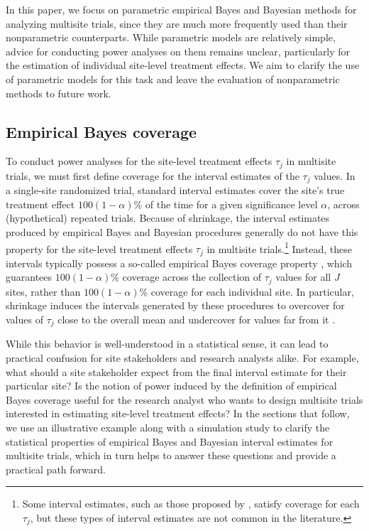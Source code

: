 \documentclass[]{article}
\begin{document}
In this paper, we focus on parametric empirical Bayes and Bayesian methods for analyzing multisite trials, since they are much more frequently used than their nonparametric counterparts.
While parametric models are relatively simple, advice for conducting power analyses on them remains unclear, particularly for the estimation of individual site-level treatment effects.
We aim to clarify the use of parametric models for this task and leave the evaluation of nonparametric methods to future work.

\subsection{Empirical Bayes coverage}

To conduct power analyses for the site-level treatment effects $\tau_j$ in multisite trials, we must first define coverage for the interval estimates of the $\tau_j$ values.
In a single-site randomized trial, standard interval estimates cover the site's true treatment effect $100(1-\alpha)$\% of the time for a given significance level $\alpha$, across (hypothetical) repeated trials.
Because of shrinkage, the interval estimates produced by empirical Bayes and Bayesian procedures generally do not have this property for the site-level treatment effects $\tau_j$ in multisite trials.\footnote{Some interval estimates, such as those proposed by \citet{yu2018adaptive}, satisfy coverage for each $\tau_j$, but these types of interval estimates are not common in the literature.}
Instead, these intervals typically possess a so-called empirical Bayes coverage property \citep{morris1983parametric}, which guarantees $100(1-\alpha)$\% coverage across the collection of $\tau_j$ values for all $J$ sites, rather than $100(1-\alpha)$\% coverage for each individual site.
In particular, shrinkage induces the intervals generated by these procedures to overcover for values of $\tau_j$ close to the overall mean and undercover for values far from it \citep{snijders2011multilevel}.

While this behavior is well-understood in a statistical sense, it can lead to practical confusion for site stakeholders and research analysts alike.
For example, what should a site stakeholder expect from the final interval estimate for their particular site?
Is the notion of power induced by the definition of empirical Bayes coverage useful for the research analyst who wants to design multisite trials interested in estimating site-level treatment effects?
In the sections that follow, we use an illustrative example along with a simulation study to clarify the statistical properties of empirical Bayes and Bayesian interval estimates for multisite trials, which in turn helps to answer these questions and provide a practical path forward.
\end{document}

